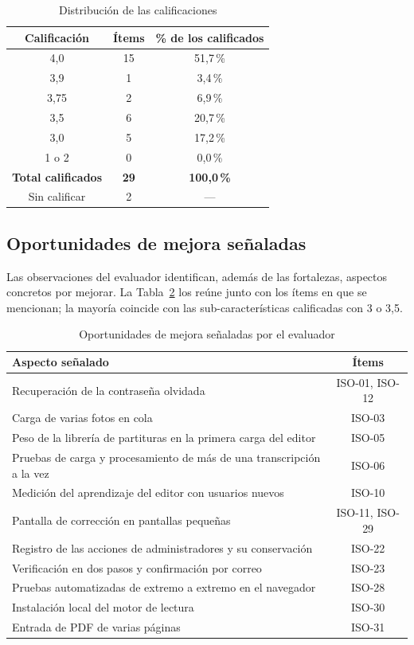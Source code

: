 \documentclass[conference]{IEEEtran}
\begin{document}
\begin{table}[htbp]
\caption{Distribución de las calificaciones}
\label{tab:distribucion-iso}
\centering
\footnotesize
\begin{tabular}{|c|c|c|}
\hline
\textbf{Calificación} & \textbf{Ítems} & \textbf{\% de los calificados} \\
\hline
4,0 & 15 & 51,7\,\% \\
\hline
3,9 & 1 & 3,4\,\% \\
\hline
3,75 & 2 & 6,9\,\% \\
\hline
3,5 & 6 & 20,7\,\% \\
\hline
3,0 & 5 & 17,2\,\% \\
\hline
1 o 2 & 0 & 0,0\,\% \\
\hline
\textbf{Total calificados} & \textbf{29} & \textbf{100,0\,\%} \\
\hline
Sin calificar & 2 & --- \\
\hline
\end{tabular}
\end{table}

\subsection{Oportunidades de mejora señaladas}

Las observaciones del evaluador identifican, además de las fortalezas,
aspectos concretos por mejorar. La Tabla~\ref{tab:mejoras-iso} los reúne
junto con los ítems en que se mencionan; la mayoría coincide con las
sub-características calificadas con 3 o 3,5.

\begin{table}[htbp]
\caption{Oportunidades de mejora señaladas por el evaluador}
\label{tab:mejoras-iso}
\centering
\footnotesize
\begin{tabular}{|p{5.4cm}|c|}
\hline
\textbf{Aspecto señalado} & \textbf{Ítems} \\
\hline
Recuperación de la contraseña olvidada & ISO-01, ISO-12 \\
\hline
Carga de varias fotos en cola & ISO-03 \\
\hline
Peso de la librería de partituras en la primera carga del editor & ISO-05 \\
\hline
Pruebas de carga y procesamiento de más de una transcripción a la vez & ISO-06 \\
\hline
Medición del aprendizaje del editor con usuarios nuevos & ISO-10 \\
\hline
Pantalla de corrección en pantallas pequeñas & ISO-11, ISO-29 \\
\hline
Registro de las acciones de administradores y su conservación & ISO-22 \\
\hline
Verificación en dos pasos y confirmación por correo & ISO-23 \\
\hline
Pruebas automatizadas de extremo a extremo en el navegador & ISO-28 \\
\hline
Instalación local del motor de lectura & ISO-30 \\
\hline
Entrada de PDF de varias páginas & ISO-31 \\
\hline
\end{tabular}
\end{table}
\end{document}
